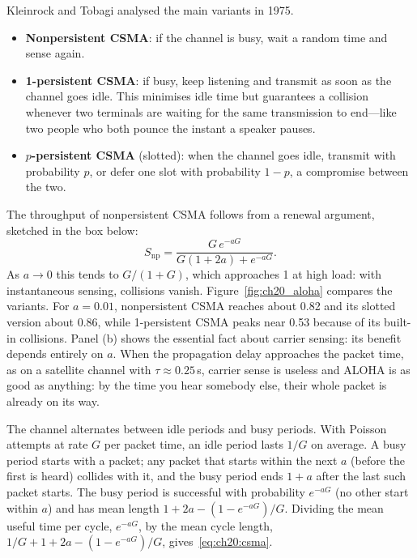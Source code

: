 Kleinrock and Tobagi analysed the main variants in 1975.
\begin{itemize}
\item \textbf{Nonpersistent CSMA}: if the channel is busy, wait a random time and sense again.
\item \textbf{1-persistent CSMA}: if busy, keep listening and transmit as soon as the channel goes idle.
This minimises idle time but guarantees a collision whenever two terminals are waiting for the same
transmission to end---like two people who both pounce the instant a speaker pauses.
\item \textbf{$p$-persistent CSMA} (slotted): when the channel goes idle, transmit with probability $p$, or
defer one slot with probability $1-p$, a compromise between the two.
\end{itemize}


The throughput of nonpersistent CSMA follows from a renewal argument, sketched in the box below:
\begin{equation}
S_{\text{np}}=\frac{G\,e^{-aG}}{G(1+2a)+e^{-aG}} .
\label{eq:ch20:csma}
\end{equation}
As $a\to0$ this tends to $G/(1+G)$, which approaches 1 at high load: with instantaneous sensing,
collisions vanish. Figure~\ref{fig:ch20_aloha} compares the variants. For $a=0.01$, nonpersistent CSMA
reaches about 0.82 and its slotted version about 0.86, while 1-persistent CSMA peaks near 0.53 because of
its built-in collisions. Panel (b) shows the essential fact about carrier sensing: its benefit depends
entirely on $a$. When the propagation delay approaches the packet time, as on a satellite channel with
$\tau\approx0.25$\,s, carrier sense is useless and ALOHA is as good as anything: by the time you hear
somebody else, their whole packet is already on its way.

\begin{deeper}
The channel alternates between idle periods and busy periods. With Poisson attempts at rate $G$ per
packet time, an idle period lasts $1/G$ on average. A busy period starts with a packet; any packet that
starts within the next $a$ (before the first is heard) collides with it, and the busy period ends $1+a$
after the last such packet starts. The busy period is successful with probability $e^{-aG}$ (no other
start within $a$) and has mean length $1+2a-(1-e^{-aG})/G$. Dividing the mean useful time per cycle,
$e^{-aG}$, by the mean cycle length, $1/G+1+2a-(1-e^{-aG})/G$, gives~\eqref{eq:ch20:csma}.
\end{deeper}

